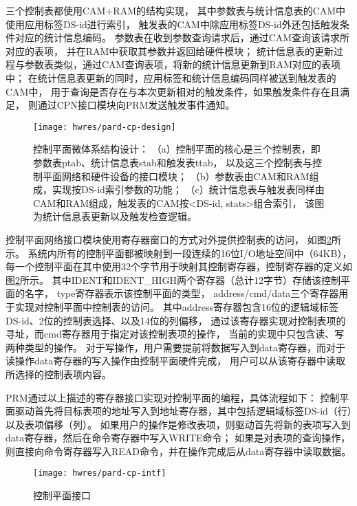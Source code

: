 三个控制表都使用CAM+RAM的结构实现，
其中参数表与统计信息表的CAM中使用应用标签DS-id进行索引，
触发表的CAM中除应用标签DS-id外还包括触发条件对应的统计信息编码。
参数表在收到参数查询请求后，通过CAM查询该请求所对应的表项，
并在RAM中获取其参数并返回给硬件模块；
统计信息表的更新过程与参数表类似，通过CAM查询表项，将新的统计信息更新到RAM对应的表项中；
在统计信息表更新的同时，应用标签和统计信息编码同样被送到触发表的CAM中，
用于查询是否存在与本次更新相对的触发条件，如果触发条件存在且满足，
则通过CPN接口模块向PRM发送触发事件通知。

\begin{figure}[tb]
  \centering
  \texttt{[image: hwres/pard-cp-design]}
  \caption[控制平面微体系结构设计]{控制平面微体系结构设计：
  （a）控制平面的核心是三个控制表，即参数表ptab、统计信息表stab和触发表ttab，
       以及这三个控制表与控制平面网络和硬件设备的接口模块；
  （b）参数表由CAM和RAM组成，实现按DS-id索引参数的功能；
  （c）统计信息表与触发表同样由CAM和RAM组成，触发表的CAM按<DS-id, stats>组合索引，
       该图为统计信息表更新以及触发检查逻辑。}
  \label{fig:pard-cp-design}
\end{figure}

控制平面网络接口模块使用寄存器窗口的方式对外提供控制表的访问，
如图\ref{fig:pard-cp-intf}所示。
系统内所有的控制平面都被映射到一段连续的16位I/O地址空间中（64KB），
每一个控制平面在其中使用32个字节用于映射其控制寄存器，控制寄存器的定义如图\ref{fig:pard-cp-intf}所示。
其中IDENT和IDENT\_HIGH两个寄存器（总计12字节）存储该控制平面的名字，
type寄存器表示该控制平面的类型，
address/cmd/data三个寄存器用于实现对控制平面中控制表的访问。
其中address寄存器包含16位的逻辑域标签DS-id、2位的控制表选择、以及14位的列偏移，
通过该寄存器实现对控制表项的寻址，而cmd寄存器用于指定对该控制表项的操作，
当前的实现中只包含读、写两种类型的操作。
对于写操作，用户需要提前将数据写入到data寄存器，而对于读操作data寄存器的写入操作由控制平面硬件完成，
用户可以从该寄存器中读取所选择的控制表项内容。

PRM通过以上描述的寄存器接口实现对控制平面的编程，具体流程如下：
控制平面驱动首先将目标表项的地址写入到地址寄存器，其中包括逻辑域标签DS-id（行）以及表项偏移（列）。
如果用户的操作是修改表项，则驱动首先将新的表项写入到data寄存器，然后在命令寄存器中写入WRITE命令；
如果是对表项的查询操作，则直接向命令寄存器写入READ命令，并在操作完成后从data寄存器中读取数据。

\begin{figure}[tb]
  \centering
  \texttt{[image: hwres/pard-cp-intf]}
  \caption[控制平面接口]{控制平面接口}
  \label{fig:pard-cp-intf}
\end{figure}


